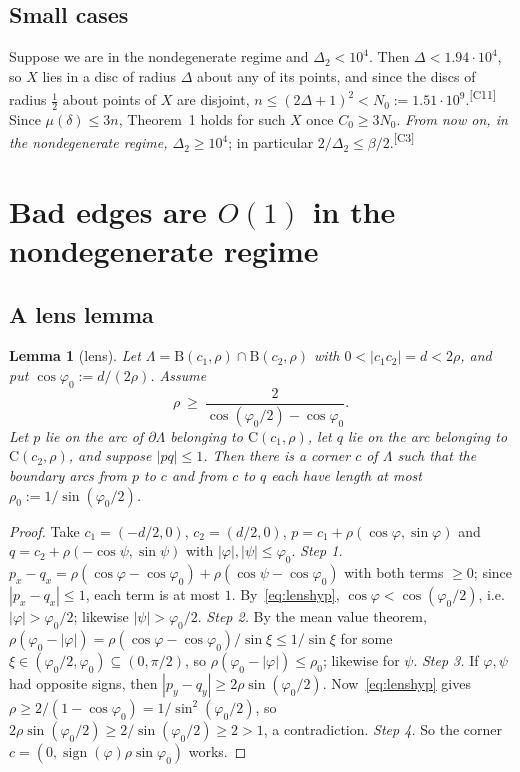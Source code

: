 \documentclass[11pt]{amsart}
\newtheorem{lemma}[theorem]{Lemma}
\theoremstyle{definition}
\theoremstyle{remark}
\newcommand{\Dt}{\Delta_2}
\newcommand{\mult}{\mu}
\newcommand{\Cc}{\mathrm{C}}      %
\newcommand{\Dd}{\mathrm{B}}      %
\newcommand{\chk}[1]{\textsuperscript{[#1]}}
\begin{document}
\subsection*{Small cases}
Suppose we are in the nondegenerate regime and $\Dt<10^4$. Then $\Delta<1.94\cdot10^4$, so $X$ lies in a disc of radius $\Delta$ about any of its points, and since the discs of radius $\frac12$ about points of $X$ are disjoint, $n\le(2\Delta+1)^2<N_0:=1.51\cdot10^9$.\chk{C11} Since $\mult(\delta)\le 3n$, Theorem~1 holds for such $X$ once $C_0\ge 3N_0$. \emph{From now on, in the nondegenerate regime, $\Dt\ge 10^4$}; in particular $2/\Dt\le\beta/2$.\chk{C3}
\section{Bad edges are \texorpdfstring{$O(1)$}{O(1)} in the nondegenerate regime}\label{sec:bad}

\subsection{A lens lemma}

\begin{lemma}[lens]\label{lem:lens}
Let $\Lambda=\Dd(c_1,\rho)\cap\Dd(c_2,\rho)$ with $0<|c_1c_2|=d<2\rho$, and put $\cos\varphi_0:=d/(2\rho)$. Assume
\begin{equation}\label{eq:lenshyp}
\rho\ \ge\ \frac{2}{\cos(\varphi_0/2)-\cos\varphi_0}.
\end{equation}
Let $p$ lie on the arc of $\partial\Lambda$ belonging to $\Cc(c_1,\rho)$, let $q$ lie on the arc belonging to $\Cc(c_2,\rho)$, and suppose $|pq|\le 1$. Then there is a corner $c$ of $\Lambda$ such that the boundary arcs from $p$ to $c$ and from $c$ to $q$ each have length at most $\rho_0:=1/\sin(\varphi_0/2)$.
\end{lemma}
\begin{proof}
Take $c_1=(-d/2,0)$, $c_2=(d/2,0)$, $p=c_1+\rho(\cos\varphi,\sin\varphi)$ and $q=c_2+\rho(-\cos\psi,\sin\psi)$ with $|\varphi|,|\psi|\le\varphi_0$.
\emph{Step 1.} $p_x-q_x=\rho(\cos\varphi-\cos\varphi_0)+\rho(\cos\psi-\cos\varphi_0)$ with both terms $\ge0$; since $|p_x-q_x|\le1$, each term is at most $1$. By~\eqref{eq:lenshyp}, $\cos\varphi<\cos(\varphi_0/2)$, i.e.\ $|\varphi|>\varphi_0/2$; likewise $|\psi|>\varphi_0/2$.
\emph{Step 2.} By the mean value theorem, $\rho(\varphi_0-|\varphi|)=\rho(\cos\varphi-\cos\varphi_0)/\sin\xi\le 1/\sin\xi$ for some $\xi\in(\varphi_0/2,\varphi_0)\subseteq(0,\pi/2)$, so $\rho(\varphi_0-|\varphi|)\le\rho_0$; likewise for $\psi$.
\emph{Step 3.} If $\varphi,\psi$ had opposite signs, then $|p_y-q_y|\ge 2\rho\sin(\varphi_0/2)$. Now~\eqref{eq:lenshyp} gives $\rho\ge 2/(1-\cos\varphi_0)=1/\sin^2(\varphi_0/2)$, so $2\rho\sin(\varphi_0/2)\ge 2/\sin(\varphi_0/2)\ge2>1$, a contradiction.
\emph{Step 4.} So the corner $c=(0,\operatorname{sign}(\varphi)\rho\sin\varphi_0)$ works.
\end{proof}
\end{document}
